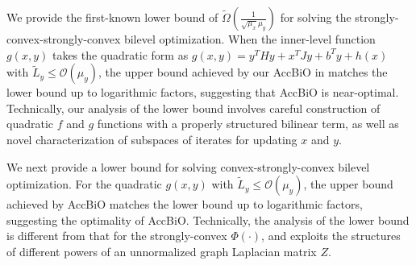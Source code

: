 \documentclass{osudissert96}
\begin{document}
\vspace{0.2cm}
  We provide the first-known lower bound of {\small $\widetilde{\Omega}(\frac{1}{\sqrt{\mu_x}\mu_y})$} for solving the strongly-convex-strongly-convex bilevel optimization.  
When the inner-level function $g(x,y)$ takes the quadratic form as {\small $g(x,y)=y^T H y +  x^T J y + b^Ty+h(x)$} with {\small $\widetilde L_y\leq \mathcal{O}(\mu_y)$}, the upper bound achieved by our AccBiO in 
matches the lower bound up to logarithmic factors, suggesting that AccBiO is near-optimal.   Technically, our analysis of the lower bound involves careful construction of quadratic $f$ and $g$ functions with a properly structured bilinear term, as well as novel characterization of subspaces of iterates for updating $x$ and $y$. 

 We next provide a lower bound for solving convex-strongly-convex bilevel optimization. 
For the quadratic $g(x,y)$ with $\widetilde L_y\leq \mathcal{O}(\mu_y)$, the upper bound achieved by AccBiO matches the lower bound up to logarithmic factors, suggesting the optimality of AccBiO. Technically, the analysis of the lower bound is different from that for the strongly-convex $\Phi(\cdot)$, and exploits the structures of different powers of an unnormalized graph Laplacian matrix $Z$. 
 
\end{document}
